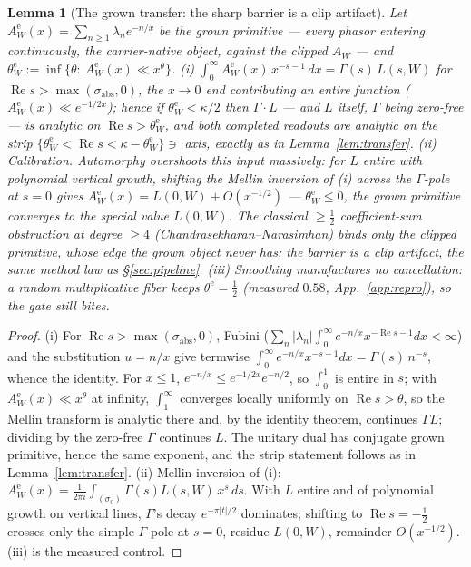 \documentclass[11pt]{article}
\newtheorem{lemma}[theorem]{Lemma}
\theoremstyle{definition}
\renewcommand{\Re}{\operatorname{Re}}
\begin{document}
\begin{lemma}[The grown transfer: the sharp barrier is a clip artifact]\label{lem:growntransfer}
Let $A^{\mathrm e}_W(x)=\sum_{n\ge1}\lambda_n e^{-n/x}$ be the \emph{grown} primitive --- every phasor
entering continuously, the carrier-native object, against the clipped $A_W$ --- and
$\theta^{\mathrm e}_W:=\inf\{\theta:\ A^{\mathrm e}_W(x)\ll x^{\theta}\}$.
\textup{(i)} $\int_0^\infty A^{\mathrm e}_W(x)\,x^{-s-1}\,dx=\Gamma(s)\,L(s,W)$ for
$\Re s>\max(\sigma_{\mathrm{abs}},0)$, the $x\to0$ end contributing an entire function
($A^{\mathrm e}_W(x)\ll e^{-1/2x}$); hence if $\theta^{\mathrm e}_W<\kappa/2$ then $\Gamma\cdot L$ ---
and $L$ itself, $\Gamma$ being zero-free --- is analytic on $\Re s>\theta^{\mathrm e}_W$, and both completed
readouts are analytic on the strip $\{\theta^{\mathrm e}_W<\Re s<\kappa-\theta^{\mathrm e}_W\}\ni$ axis,
exactly as in Lemma~\ref{lem:transfer}.
\textup{(ii)} \emph{Calibration.} Automorphy overshoots this input massively: for $L$ entire with
polynomial vertical growth, shifting the Mellin inversion of \textup{(i)} across the $\Gamma$-pole at $s=0$
gives $A^{\mathrm e}_W(x)=L(0,W)+O(x^{-1/2})$ --- $\theta^{\mathrm e}_W\le0$, the grown primitive
\emph{converges to the special value} $L(0,W)$. The classical $\ge\tfrac12$ coefficient-sum obstruction at
degree $\ge4$ (Chandrasekharan--Narasimhan) binds only the \emph{clipped} primitive, whose edge the grown
object never has: the barrier is a clip artifact, the same method law as \S\ref{sec:pipeline}.
\textup{(iii)} Smoothing manufactures no cancellation: a random multiplicative fiber keeps
$\theta^{\mathrm e}=\tfrac12$ (measured $0.58$, App.~\ref{app:repro}), so the gate still bites.
\end{lemma}
\begin{proof}
\textup{(i)} For $\Re s>\max(\sigma_{\mathrm{abs}},0)$, Fubini
($\sum_n|\lambda_n|\int_0^\infty e^{-n/x}x^{-\Re s-1}dx<\infty$) and the substitution $u=n/x$ give termwise
$\int_0^\infty e^{-n/x}x^{-s-1}dx=\Gamma(s)\,n^{-s}$, whence the identity. For $x\le1$,
$e^{-n/x}\le e^{-1/2x}e^{-n/2}$, so $\int_0^1$ is entire in $s$; with $A^{\mathrm e}_W(x)\ll x^{\theta}$ at
infinity, $\int_1^\infty$ converges locally uniformly on $\Re s>\theta$, so the Mellin transform is analytic
there and, by the identity theorem, continues $\Gamma L$; dividing by the zero-free $\Gamma$ continues $L$.
The unitary dual has conjugate grown primitive, hence the same exponent, and the strip statement follows as
in Lemma~\ref{lem:transfer}.
\textup{(ii)} Mellin inversion of \textup{(i)}: $A^{\mathrm e}_W(x)=\frac1{2\pi i}\int_{(\sigma_0)}
\Gamma(s)L(s,W)\,x^{s}\,ds$. With $L$ entire and of polynomial growth on vertical lines, $\Gamma$'s decay
$e^{-\pi|t|/2}$ dominates; shifting to $\Re s=-\tfrac12$ crosses only the simple $\Gamma$-pole at $s=0$,
residue $L(0,W)$, remainder $O(x^{-1/2})$.
\textup{(iii)} is the measured control.
\end{proof}
\end{document}
